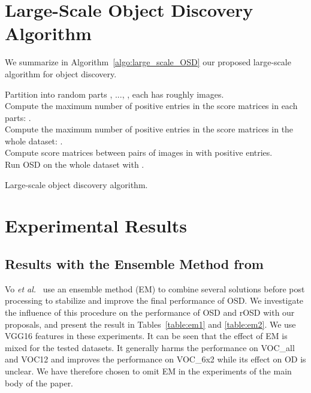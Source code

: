 \documentclass[runningheads]{llncs}
\begin{document}
\section{Large-Scale Object Discovery Algorithm}
We summarize in Algorithm~\ref{algo:large_scale_OSD} our proposed large-scale algorithm for object discovery.
\begin{algorithm}[htb]
\SetAlgoLined
{}
Partition  into random  parts , ..., , each has roughly  images. \\
Compute the maximum number of positive entries in the score matrices in each parts:
. \\
Compute the maximum number of positive entries in the score matrices in the whole dataset:
. \\
Compute score matrices between pairs of images in  with  positive entries.\\
Run OSD on the whole dataset  with .
\caption{Large-scale object discovery algorithm.}
\label{algo:large_scale_OSD}
\end{algorithm}


\section{Experimental Results}


\subsection{Results with the Ensemble Method from~\cite{Vo2019UnsupOptim}}

Vo {\em et al.}~\cite{Vo2019UnsupOptim} use an ensemble method (EM) to combine several solutions before post processing to stabilize and improve the final performance of OSD. We investigate the influence of this procedure on the performance of OSD and rOSD with our proposals, and present the result in Tables~\ref{table:em1} and \ref{table:em2}. We use VGG16 features in these experiments. It can be seen that the effect of EM is mixed for the tested datasets. It generally harms the performance on VOC\_all and VOC12 and improves the performance on VOC\_6x2 while its effect on OD is unclear. We have therefore chosen to omit EM in the experiments of the main body of the paper.
\end{document}
